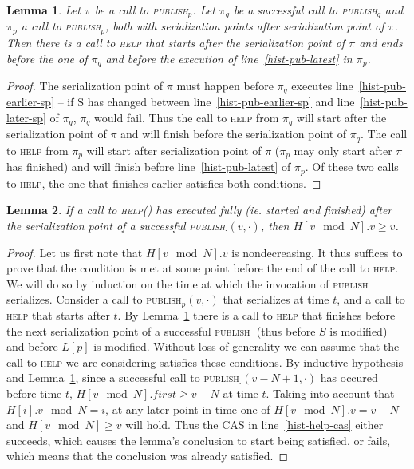 \documentclass{thesis}
\newtheorem{lemma}{Lemma}
\newcommand{\fn}[1]{\textsc{#1}}
\begin{document}
\begin{lemma}\label{lem-hist-help-comes}
Let $\pi$ be a call to \fn{publish$_p$}. Let $\pi_q$ be a successful call to \fn{publish$_q$} and $\pi_p$ a call to \fn{publish$_p$}, both with serialization points after serialization point of $\pi$. Then there is a call to \fn{help} that starts after the serialization point of $\pi$ and ends before the one of $\pi_q$ and 
before the execution of line~\ref{hist-pub-latest} in $\pi_p$.
\end{lemma}
\begin{proof}
The serialization point of $\pi$ must happen before $\pi_q$ executes line~\ref{hist-pub-earlier-sp} -- if S has changed between line~\ref{hist-pub-earlier-sp} and line~\ref{hist-pub-later-sp} of $\pi_q$, $\pi_q$ would fail.
Thus the call to \fn{help} from $\pi_q$ will start after the serialization point of $\pi$ and will finish before the serialization point of $\pi_q$. The call to \fn{help}
from $\pi_p$ will start after serialization point of $\pi$ ($\pi_p$ may only start after $\pi$ has finished) and will finish before line~\ref{hist-pub-latest} of $\pi_p$.
Of these two calls to \fn{help}, the one that finishes earlier satisfies both conditions.
\end{proof}

\begin{lemma}
\label{lem-hist-is-complete}
If a call to \fn{help}() has executed fully (ie. started and finished) after the serialization point of a successful \fn{publish$_\cdot$}$(v, \cdot)$, then $H[v\mod N].v \geq v$.
\end{lemma}
\begin{proof}
Let us first note that $H[v\mod N].v$ is nondecreasing.
It thus suffices to prove that the condition is met at some point before the end of the call to \fn{help}. We will do so by induction on the time at which the invocation of \fn{publish} serializes.
Consider a call to \fn{publish$_p$}$(v, \cdot)$ that serializes at time $t$, and a call to \fn{help} that starts after $t$. By Lemma~\ref{lem-hist-help-comes} there is a call to \fn{help} that finishes before the next serialization point of a successful \fn{publish$_\cdot$} (thus before $S$
is modified) and before $L[p]$ is modified. Without loss of generality we can assume that the call to \fn{help} we are considering satisfies these conditions. By inductive hypothesis and Lemma~\ref{lem-hist-help-comes}, since a successful call to \fn{publish$_\cdot$}$(v-N+1, \cdot)$ has occured before time $t$, $H[v \mod N].first \geq v-N$ at time $t$. Taking into account that $H[i].v \mod N = i$, at any later point in time one of $H[v \mod N].v = v-N$ and $H[v \mod N] \geq v$ will hold.
Thus the CAS in line~\ref{hist-help-cas} either succeeds, which causes the lemma's conclusion to start being satisfied, or fails, which means that the conclusion was already satisfied.
\end{proof} %
\end{document}
